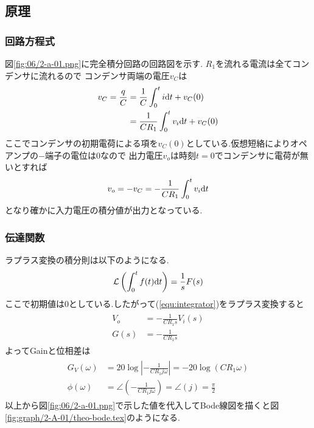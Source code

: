 \subsection{原理}
\subsubsection{回路方程式}
図\ref{fig:06/2-a-01.png}に完全積分回路の回路図を示す.
$R_1$を流れる電流は全てコンデンサに流れるので
コンデンサ両端の電圧$v_C$は
\begin{align}
  \begin{split}
    v_C=\frac{q}{C}&=\frac{1}{C}\int^t_0i{\rm d}t+v_C(0)\\
    &=\frac{1}{CR_1}\int^t_0v_i{\rm d}t+v_C(0)
  \end{split}
\end{align}
ここでコンデンサの初期電荷による項を$v_C(0)$としている.仮想短絡によりオペアンプの$-$端子の電位は0なので
出力電圧$v_o$は時刻$t=0$でコンデンサに電荷が無いとすれば
\begin{align}
  \label{equ:integrator}
  v_o=-v_C=-\frac{1}{CR_1}\int^t_0v_i{\rm d}t
\end{align}
となり確かに入力電圧の積分値が出力となっている.
\clearpage
\subsubsection{伝達関数}
ラプラス変換の積分則は以下のようになる.
\begin{align}
  \mathcal{L}\left(\int^t_0f(t){\rm d}t\right)=\frac{1}{s}F(s)
\end{align}
ここで初期値は0としている.したがって(\ref{equ:integrator})をラプラス変換すると
\begin{align}
  \begin{split}
    V_o&=-\frac{1}{CR_1s}V_i(s)\\
    G(s)&=-\frac{1}{CR_1s}
  \end{split}
\end{align}
よってGainと位相差は
\begin{align}
  \begin{split}
    G_V(\omega)&=20\log\left|-\frac{1}{CR_1j\omega}\right|=-20\log(CR_1\omega)\\
    \phi(\omega)&=\angle\left(-\frac{1}{CR_1j\omega}\right)=\angle(j)=\frac{\pi}{2}
  \end{split}
\end{align}
以上から図\ref{fig:06/2-a-01.png}で示した値を代入してBode線図を描くと図\ref{fig:graph/2-A-01/theo-bode.tex}のようになる.
